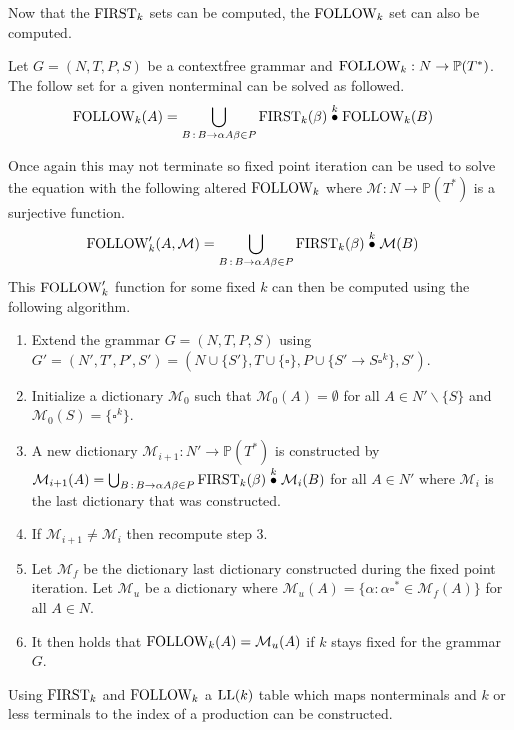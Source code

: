 Now that the $\text{FIRST}_k$ sets can be computed, the $\text{FOLLOW}_k$ set can also be computed. 
\begin{algorithm}
    \label{algorithm:follow}
    Let $G = (N, T, P, S)$ be a context\-free grammar and $\text{FOLLOW}_k: N \to \mathbb{P}(T^*)$. The follow set for a given nonterminal can be solved as followed.
    \begin{align*}
        \FOLLOW_k(A) &= \bigcup_{B \, : \, B \to \alpha A \beta \in P} \FIRST_k(\beta) \truncprod{k} \FOLLOW_k(B)
    \end{align*}
\end{algorithm}
\noindent Once again this may not terminate so fixed point iteration can be used to solve the equation with the following altered $\text{FOLLOW}_k$ where $\mathcal{M}: N \to \mathbb{P}(T^*)$ is a surjective function.
\begin{align*}
    \FOLLOW'_k(A, \mathcal{M}) &= \bigcup_{B \,: \, B \to \alpha A \beta \in P} \FIRST_k(\beta) \truncprod{k} \mathcal{M}(B)
\end{align*}
This $\text{FOLLOW}'_k$ function for some fixed $k$ can then be computed using the following algorithm.
\begin{enumerate}
    \item Extend the grammar $G = (N, T, P, S)$ using $G' = (N', T', P', S') = (N \cup \{S'\}, T \cup \{\square\}, P \cup \{S' \to S \square^k\}, S')$.
    \item Initialize a dictionary $\mathcal{M}_0$ such that $\mathcal{M}_0(A) = \emptyset$ for all $A \in N' \backslash \{S\}$ and $\mathcal{M}_0(S) = \{\square^k\}$.
    \item A new dictionary $\mathcal{M}_{i+1}: N' \to \mathbb{P}(T^*)$ is constructed by $\mathcal{M}_{i+1}(A) = \bigcup_{B \,: \, B \to  \alpha A \beta \in P} \FIRST_k(\beta) \truncprod{k} \mathcal{M}_{i}(B)$ for all $A \in N'$ where $\mathcal{M}_{i}$ is the last dictionary that was constructed.
    \item If $\mathcal{M}_{i+1} \neq \mathcal{M}_{i}$ then recompute step 3.
    \item Let $\mathcal{M}_f$ be the dictionary last dictionary constructed during the fixed point iteration. Let $\mathcal{M}_u$ be a dictionary where $\mathcal{M}_u(A) = \{\alpha : \alpha \square^* \in \mathcal{M}_f(A)\}$ for all $A \in N$.
    \item It then holds that $\text{FOLLOW}_k(A) = \mathcal{M}_u(A)$ if $k$ stays fixed for the grammar $G$.
\end{enumerate}
Using $\text{FIRST}_k$ and $\text{FOLLOW}_k$ a $\text{LL}(k)$ table which maps nonterminals and $k$ or less terminals to the index of a production can be constructed.
